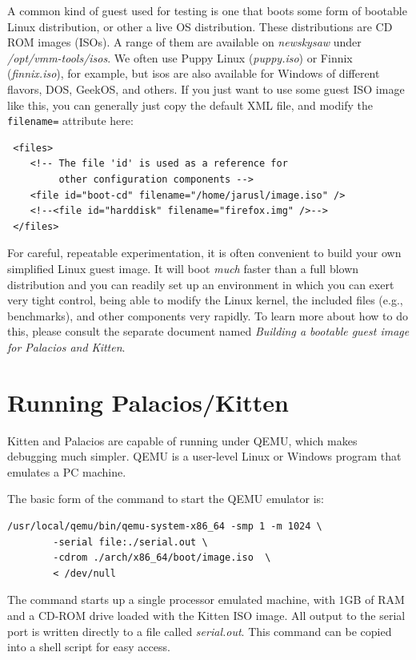 \documentclass[11pt]{article}
\begin{document}
A common kind of guest used for testing is one that boots some form of
bootable Linux distribution, or other a live OS distribution.  These
distributions are CD ROM images (ISOs).  A range of them are available
on {\em newskysaw} under {\em /opt/vmm-tools/isos}.  We often use
Puppy Linux ({\em puppy.iso}) or Finnix ({\em finnix.iso}), for
example, but isos are also available for Windows of different flavors,
DOS, GeekOS, and others.  If you just want to use some guest ISO image
like this, you can generally just copy the default XML file, and
modify the
\verb.filename=. attribute here:
\begin{verbatim}
 <files>
    <!-- The file 'id' is used as a reference for 
         other configuration components -->
    <file id="boot-cd" filename="/home/jarusl/image.iso" />
    <!--<file id="harddisk" filename="firefox.img" />-->
 </files>
\end{verbatim}

For careful, repeatable experimentation, it is often convenient to
build your own simplified Linux guest image.  It will boot {\em much}
faster than a full blown distribution and you can readily set up an
environment in which you can exert very tight control, being able to
modify the Linux kernel, the included files (e.g., benchmarks), and
other components very rapidly.  To learn more about how to do this,
please consult the separate document named {\em Building a bootable
guest image for Palacios and Kitten}.

\section{Running Palacios/Kitten}
Kitten and Palacios are capable of running under QEMU, which makes
debugging much simpler.  QEMU is a user-level Linux or Windows program
that emulates a PC machine. 

The basic form of the command to start the QEMU emulator is:
\begin{verbatim}
/usr/local/qemu/bin/qemu-system-x86_64 -smp 1 -m 1024 \
        -serial file:./serial.out \
        -cdrom ./arch/x86_64/boot/image.iso  \
        < /dev/null
\end{verbatim}

The command starts up a single processor emulated machine, with 1GB of
RAM and a CD-ROM drive loaded with the Kitten ISO image.  All output
to the serial port is written directly to a file called {\em
  serial.out}. This command can be copied into a shell script for easy
access.
\end{document}
